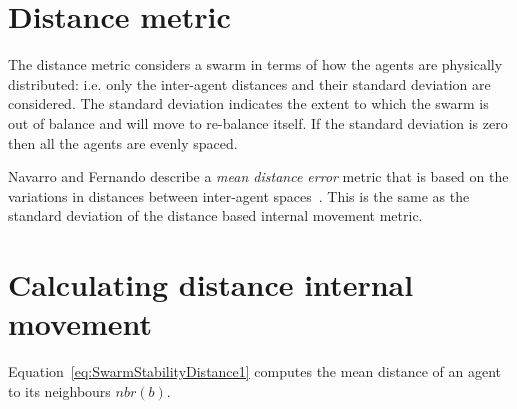 \documentclass{ieeeaccess}
\begin{document}
\section{Distance metric\label{section:DistanceDynamics}}
The distance metric considers a swarm in terms of how the agents are physically distributed: i.e. only the inter-agent distances and their standard deviation are considered. The standard deviation indicates the extent to which the swarm is out of balance and will move to re-balance itself. If the standard deviation is zero then all the agents are evenly spaced. 


Navarro and Fernando describe a \emph{mean distance error} metric that is based on the variations in distances between inter-agent spaces~\cite{NIM:09}. This is the same as the standard deviation of the distance based internal movement metric. 



\section{Calculating distance internal movement}
Equation~\ref{eq:SwarmStabilityDistance1} computes the mean distance of an agent to its neighbours $nbr(b)$. 
\end{document}
